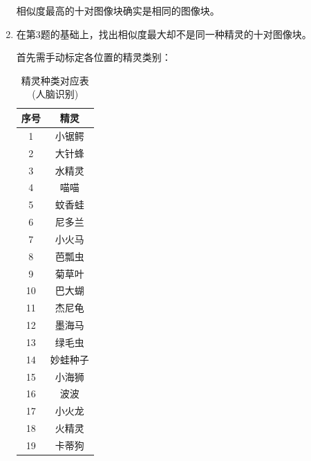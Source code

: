 \documentclass{article}
\numberwithin{figure}{section}
\numberwithin{table}{section}
\numberwithin{listing}{section}
\numberwithin{equation}{section}
\begin{document}
\begin{enumerate}
                相似度最高的十对图像块确实是相同的图像块。

            \item 在第3题的基础上，找出相似度最大却不是同一种精灵的十对图像块。

                首先需手动标定各位置的精灵类别：

                \begin{table}[h]
                    \caption{精灵种类对应表(人脑识别)}
                    \label{tab:pokemon}
                    \centering
                
                    \begin{tabular}{c|c}
                    \hline
                
                    \hline
                    \textbf{序号} & \textbf{精灵} \\
                    \hline
                        1 & 小锯鳄 \\
                        2 & 大针蜂 \\
                        3 & 水精灵 \\
                        4 & 喵喵 \\
                        5 & 蚊香蛙 \\
                        6 & 尼多兰 \\
                        7 & 小火马 \\
                        8 & 芭瓢虫 \\
                        9 & 菊草叶 \\
                        10 & 巴大蝴 \\
                        11 & 杰尼龟 \\
                        12 & 墨海马 \\
                        13 & 绿毛虫 \\
                        14 & 妙蛙种子 \\
                        15 & 小海狮 \\
                        16 & 波波 \\
                        17 & 小火龙 \\
                        18 & 火精灵 \\
                        19 & 卡蒂狗 \\
                    \hline
                
                    \hline
                    \end{tabular}
                \end{table}


\end{enumerate}
\end{document}
